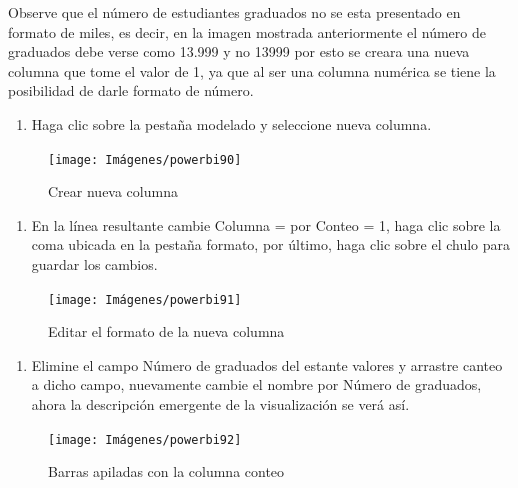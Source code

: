 \documentclass[
]{book}
\providecommand{\tightlist}{%
  \setlength{\itemsep}{0pt}\setlength{\parskip}{0pt}}
\begin{document}
Observe que el número de estudiantes graduados no se esta presentado en formato de miles, es decir, en la imagen mostrada anteriormente el número de graduados debe verse como 13.999 y no 13999 por esto se creara una nueva columna que tome el valor de 1, ya que al ser una columna numérica se tiene la posibilidad de darle formato de número.

\begin{enumerate}
\def\labelenumi{\arabic{enumi}.}
\tightlist
\item
  Haga clic sobre la pestaña modelado y seleccione nueva columna.
\end{enumerate}

\begin{figure}

{\centering \texttt{[image: Imágenes/powerbi90]} 

}

\caption{Crear nueva columna}\label{fig:paso1crearconteo-fig}
\end{figure}

\begin{enumerate}
\def\labelenumi{\arabic{enumi}.}
\setcounter{enumi}{1}
\tightlist
\item
  En la línea resultante cambie Columna = por Conteo = 1, haga clic sobre la coma ubicada en la pestaña formato, por último, haga clic sobre el chulo para guardar los cambios.
\end{enumerate}

\begin{figure}

{\centering \texttt{[image: Imágenes/powerbi91]} 

}

\caption{Editar el formato de la nueva columna}\label{fig:paso2crearconteo-fig}
\end{figure}

\begin{enumerate}
\def\labelenumi{\arabic{enumi}.}
\setcounter{enumi}{2}
\tightlist
\item
  Elimine el campo Número de graduados del estante valores y arrastre canteo a dicho campo, nuevamente cambie el nombre por Número de graduados, ahora la descripción emergente de la visualización se verá así.
\end{enumerate}

\begin{figure}

{\centering \texttt{[image: Imágenes/powerbi92]} 

}

\caption{Barras apiladas con la columna conteo}\label{fig:paso3crearconteo-fig}
\end{figure}
\end{document}
